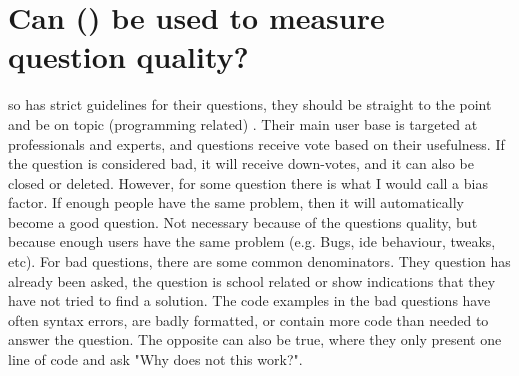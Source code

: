 \section[Can Stack Overflow be used to measure question quality?]{Can  () be used to measure question quality?}
\label{sec:so_and_question_quality}
\begin{comment}
As previously mentioned in Section \ref{sec:feature_sets}, there was no clear indicator for the good questions. 
Some consisted only of two sentences, e.g. "I committed the wrong files to Git. How can I undo this commit?"\footnote{
This question currently have a score of 10,406: \\ 
\url{http://stackoverflow.com/questions/927358/how-do-you-undo-the-last-commit}.
}. Common for many of the top-voted questions is that they are short, but that is not the case for all of them\footnote{
One example is this question, with a score of 3,009: \\
\url{http://stackoverflow.com/questions/826782/css-rule-to-disable-text-selection-highlighting}.
}.

\vspace{0.5em}\newline
\end{comment}
\gls{so} has strict guidelines for their questions, they should be straight to the point and be on topic (programming related) \cite{CommunityWiki2016a,Heyer2012}.
Their main user base is targeted at professionals and experts, and questions receive vote based on their usefulness.
If the question is considered bad, it will receive down-votes, and it can also be closed or deleted. 
However, for some question there is what I would call a bias factor. 
If enough people have the same problem, then it will automatically become a good question. 
Not necessary because of the questions quality, but because enough users have the same problem (e.g. Bugs, \gls{ide} behaviour, tweaks, etc).
\vspace{0.5em}\newline
For bad questions, there are some common denominators.
They question has already been asked, the question is school related or show indications that they have not tried to find a solution. 
The code examples in the bad questions have often syntax errors, are badly formatted, or contain more code than needed to answer the question. 
The opposite can also be true, where they only present one line of code and ask "Why does not this work?".
\vspace{0.5em}\newline
